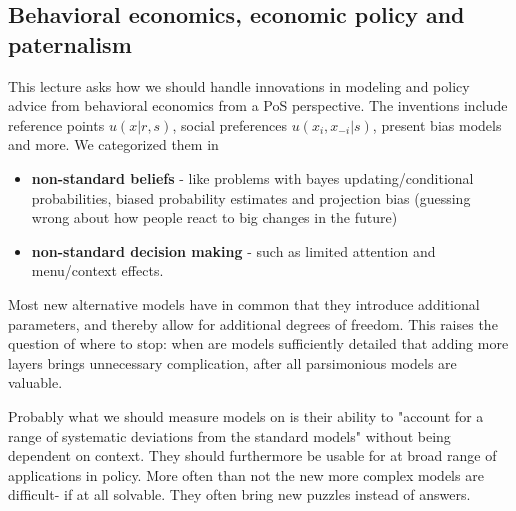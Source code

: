 \documentclass[12pt, a4paper]{article}
\begin{document}
\begin{multicols}{2}
\subsection{Behavioral economics, economic policy and paternalism}
This lecture asks how we should handle innovations in modeling and policy advice from behavioral economics from a PoS perspective. The inventions include reference points $u(x|r,s)$, social preferences $u(x_i, x_{-i}|s)$, present bias models and more. We categorized them in 
\begin{itemize}
\item \textbf{non-standard beliefs} - like problems with bayes updating/conditional probabilities, biased probability estimates and projection bias (guessing wrong about how people react to big changes in the future)
\item \textbf{non-standard decision making} - such as limited attention and menu/context effects.
\end{itemize}
Most new alternative models have in common that they introduce additional parameters, and thereby allow for additional degrees of freedom. This raises the question of where to stop: when are models sufficiently detailed that adding more layers brings unnecessary complication, after all parsimonious models are valuable. 

Probably what we should measure models on is their ability to "account for a range of systematic deviations from the standard models" without being dependent on context. They should furthermore be usable for at broad range of applications in policy.
More often than not the new more complex models are difficult- if at all solvable. They often bring new puzzles instead of answers.


\end{multicols}
\end{document}
